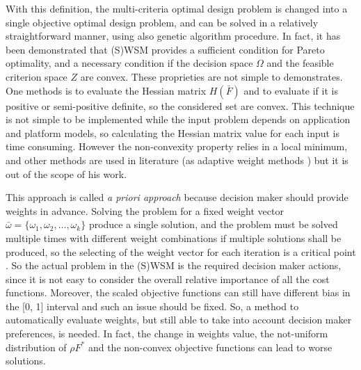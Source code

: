 %
With this definition, the multi-criteria optimal design problem is changed into a single objective optimal design problem, and can be solved in a relatively straightforward manner, using also genetic algorithm procedure. In fact, it has been demonstrated \cite{miettinen} that (S)WSM provides a sufficient condition for Pareto optimality, and a necessary condition if the decision space $\Omega$ and the feasible criterion space $Z$ are convex. These proprieties are not simple to demonstrates. One methods is to evaluate the Hessian matrix $H(\bar F)$ and to evaluate if it is positive or semi-positive definite, so the considered set are convex. This technique is not simple to be implemented while the input problem depends on application and platform models, so calculating the Hessian matrix value for each input is time consuming. However the non-convexity property relies in a local minimum, and other methods are used in literature (as adaptive weight methods \cite{apost_01}) but it is out of the scope of his work. \par
This approach is called \textit{a priori approach} because decision maker should provide weights in advance. Solving the problem for a fixed weight vector $\bar \omega = \{\omega_1, \omega_2, \ldots , \omega_k \}$ produce a single solution, and the problem must be solved multiple times with different weight combinations if multiple solutions shall be produced, so the selecting of the weight vector for each iteration is a critical point \cite{bibGATutorial}. So the actual problem in the (S)WSM is the required decision maker actions, since it is not easy to consider the overall relative importance of all the cost functions. Moreover, the scaled objective functions can still have different bias in the [0, 1] interval and such an issue should be fixed. So, a method to automatically evaluate weights, but still able to take into account decision maker preferences, is needed. In fact, the change in weights value, the not-uniform distribution of $\rho F^\ast$ and the non-convex objective functions can lead to worse solutions. \par
%
%
%
%
